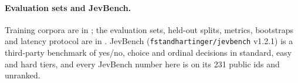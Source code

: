 \paragraph{Evaluation sets and JevBench.}
\label{sec:setup:data}
\label{sec:setup:jevbench}
Training corpora are in ; the evaluation sets, held-out splits, metrics, bootstraps
and latency protocol are in . JevBench
(\texttt{fstandhartinger/jevbench} v1.2.1) is a third-party benchmark of yes/no, choice and ordinal
decisions in standard, easy and hard tiers, and every JevBench number here is on its 231 public ids and
unranked.
